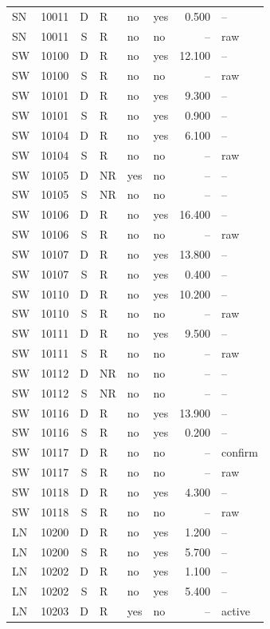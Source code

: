 \begin{longtable}{@{}llclllrl@{}}
SN & 10011 & D & R & no & yes & 0.500 & --\\
SN & 10011 & S & R & no & no & -- & raw\\
SW & 10100 & D & R & no & yes & 12.100 & --\\
SW & 10100 & S & R & no & no & -- & raw\\
SW & 10101 & D & R & no & yes & 9.300 & --\\
SW & 10101 & S & R & no & yes & 0.900 & --\\
SW & 10104 & D & R & no & yes & 6.100 & --\\
SW & 10104 & S & R & no & no & -- & raw\\
SW & 10105 & D & NR & yes & no & -- & --\\
SW & 10105 & S & NR & no & no & -- & --\\
SW & 10106 & D & R & no & yes & 16.400 & --\\
SW & 10106 & S & R & no & no & -- & raw\\
SW & 10107 & D & R & no & yes & 13.800 & --\\
SW & 10107 & S & R & no & yes & 0.400 & --\\
SW & 10110 & D & R & no & yes & 10.200 & --\\
SW & 10110 & S & R & no & no & -- & raw\\
SW & 10111 & D & R & no & yes & 9.500 & --\\
SW & 10111 & S & R & no & no & -- & raw\\
SW & 10112 & D & NR & no & no & -- & --\\
SW & 10112 & S & NR & no & no & -- & --\\
SW & 10116 & D & R & no & yes & 13.900 & --\\
SW & 10116 & S & R & no & yes & 0.200 & --\\
SW & 10117 & D & R & no & no & -- & confirm\\
SW & 10117 & S & R & no & no & -- & raw\\
SW & 10118 & D & R & no & yes & 4.300 & --\\
SW & 10118 & S & R & no & no & -- & raw\\
LN & 10200 & D & R & no & yes & 1.200 & --\\
LN & 10200 & S & R & no & yes & 5.700 & --\\
LN & 10202 & D & R & no & yes & 1.100 & --\\
LN & 10202 & S & R & no & yes & 5.400 & --\\
LN & 10203 & D & R & yes & no & -- & active\\

\end{longtable}
